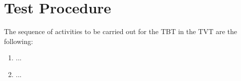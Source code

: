 \section{Test Procedure} \label{sec:Test_procedure}

The sequence of activities to be carried out for the TBT in the TVT are the following:

\begin{enumerate}
    \item{...}
    \item{...}
\end{enumerate}